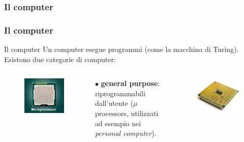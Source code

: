 \subsubsection[Il computer]{Il computer}
\begin{frame}
	\frametitle{Il computer}
	
	\begin{block}{Il computer}
		Un computer esegue programmi (come la macchina di Turing).\\
		Esistono due categorie di computer:
		\begin{columns}			
			\begin{figure}[!htbp]
				\centering 
				\includegraphics[width=0.7\linewidth]{images/1_i_sistemi/microprocessor.jpeg}
			\end{figure}
			
			$\bullet$ \textbf{general purpose}:\\riprogrammabili dall'utente ($\mu$processors, utilizzati ad esempio nei \textit{personal computer}).
			
			\begin{figure}[!htbp]
				\centering
				\advance\leftskip-0.5cm
				\includegraphics[width=1.0\linewidth]{images/1_i_sistemi/microprocessor.png}
			\end{figure}
			

\end{columns}
\end{block}
\end{frame}
